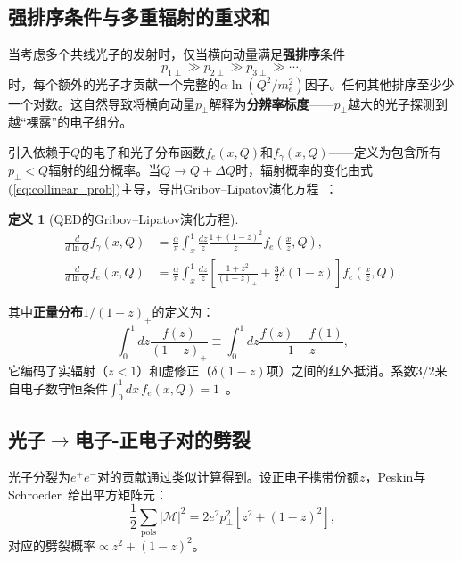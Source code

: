 \documentclass[12pt,a4paper]{ctexart}
\theoremstyle{definition}
\newtheorem{definition}{定义}[section]
\begin{document}
\subsection{强排序条件与多重辐射的重求和}

当考虑多个共线光子的发射时，仅当横向动量满足\textbf{强排序}条件
\begin{equation}
p_{1\perp} \gg p_{2\perp} \gg p_{3\perp} \gg \cdots,
\label{eq:strong_ordering}
\end{equation}
时，每个额外的光子才贡献一个完整的$\alpha\ln(Q^2/m_e^2)$因子。任何其他排序至少少一个对数。这自然导致将横向动量$p_\perp$解释为\textbf{分辨率标度}——$p_\perp$越大的光子探测到越``裸露''的电子组分。

引入依赖于$Q$的电子和光子分布函数$f_e(x, Q)$和$f_\gamma(x, Q)$——定义为包含所有$p_\perp < Q$辐射的组分概率。当$Q \to Q + \Delta Q$时，辐射概率的变化由式(\ref{eq:collinear_prob})主导，导出Gribov--Lipatov演化方程~\cite{PeskinSchroeder1995}：

\begin{definition}[QED的Gribov--Lipatov演化方程]
\begin{equation}
\begin{aligned}
\frac{d}{d\ln Q} f_\gamma(x, Q) &= \frac{\alpha}{\pi} \int_x^1 \frac{dz}{z} \frac{1+(1-z)^2}{z} f_e\!\left(\frac{x}{z}, Q\right), \\[4pt]
\frac{d}{d\ln Q} f_e(x, Q) &= \frac{\alpha}{\pi} \int_x^1 \frac{dz}{z} \left[ \frac{1+z^2}{(1-z)_+} + \frac{3}{2}\delta(1-z) \right] f_e\!\left(\frac{x}{z}, Q\right).
\end{aligned}
\label{eq:GL_equations}
\end{equation}
\end{definition}

其中\textbf{正量分布}$1/(1-z)_+$的定义为：
\begin{equation}
\int_0^1 dz \frac{f(z)}{(1-z)_+} \equiv \int_0^1 dz \frac{f(z) - f(1)}{1-z},
\label{eq:plus_distribution}
\end{equation}
它编码了实辐射（$z<1$）和虚修正（$\delta(1-z)$项）之间的红外抵消。系数$3/2$来自电子数守恒条件$\int_0^1 dx\, f_e(x, Q) = 1$~\cite{PeskinSchroeder1995}。

\subsection{光子$\to$电子-正电子对的劈裂}

光子分裂为$e^+e^-$对的贡献通过类似计算得到。设正电子携带份额$z$，Peskin与Schroeder~\cite{PeskinSchroeder1995}给出平方矩阵元：
\begin{equation}
\frac{1}{2}\sum_{\text{pols}} |\mathcal{M}|^2 = 2e^2 p_\perp^2 \left[ z^2 + (1-z)^2 \right],
\label{eq:photon_splitting_sq}
\end{equation}
对应的劈裂概率$\propto z^2 + (1-z)^2$。
\end{document}
